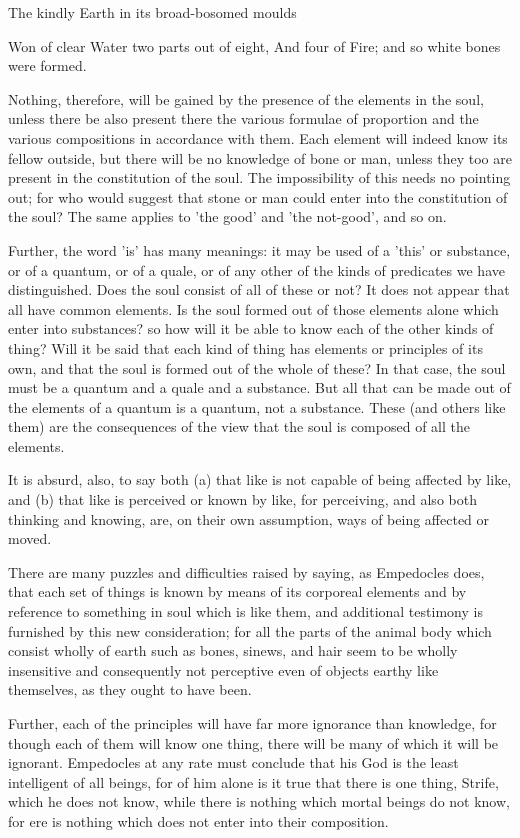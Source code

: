 The kindly Earth in its broad-bosomed moulds 

Won of clear Water two parts out of eight, And four of Fire; and so
white bones were formed. 

Nothing, therefore, will be gained by the presence of the elements
in the soul, unless there be also present there the various formulae
of proportion and the various compositions in accordance with them.
Each element will indeed know its fellow outside, but there will be
no knowledge of bone or man, unless they too are present in the constitution
of the soul. The impossibility of this needs no pointing out; for
who would suggest that stone or man could enter into the constitution
of the soul? The same applies to 'the good' and 'the not-good', and
so on. 

Further, the word 'is' has many meanings: it may be used of a 'this'
or substance, or of a quantum, or of a quale, or of any other of the
kinds of predicates we have distinguished. Does the soul consist of
all of these or not? It does not appear that all have common elements.
Is the soul formed out of those elements alone which enter into substances?
so how will it be able to know each of the other kinds of thing? Will
it be said that each kind of thing has elements or principles of its
own, and that the soul is formed out of the whole of these? In that
case, the soul must be a quantum and a quale and a substance. But
all that can be made out of the elements of a quantum is a quantum,
not a substance. These (and others like them) are the consequences
of the view that the soul is composed of all the elements.

It is absurd, also, to say both (a) that like is not capable of being
affected by like, and (b) that like is perceived or known by like,
for perceiving, and also both thinking and knowing, are, on their
own assumption, ways of being affected or moved. 

There are many puzzles and difficulties raised by saying, as Empedocles
does, that each set of things is known by means of its corporeal elements
and by reference to something in soul which is like them, and additional
testimony is furnished by this new consideration; for all the parts
of the animal body which consist wholly of earth such as bones, sinews,
and hair seem to be wholly insensitive and consequently not perceptive
even of objects earthy like themselves, as they ought to have been.

Further, each of the principles will have far more ignorance than
knowledge, for though each of them will know one thing, there will
be many of which it will be ignorant. Empedocles at any rate must
conclude that his God is the least intelligent of all beings, for
of him alone is it true that there is one thing, Strife, which he
does not know, while there is nothing which mortal beings do not know,
for ere is nothing which does not enter into their composition.

